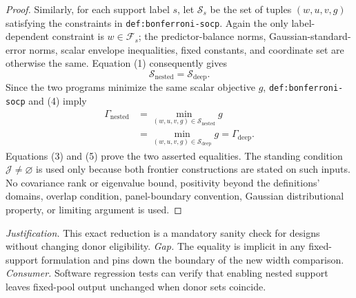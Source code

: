 \documentclass{article}
\begin{document}
\begin{proof}
Similarly, for each support label \(s\), let \(\mathcal S_s\) be the set of tuples \((w,u,v,g)\) satisfying the constraints in \texttt{def:bonferroni-socp}.  Again the only label-dependent constraint is \(w\in\mathcal F_s\); the predictor-balance norms, Gaussian-standard-error norms, scalar envelope inequalities, fixed constants, and coordinate set are otherwise the same.  Equation (1) consequently gives
\[
 \mathcal S_{\mathrm{nested}}=\mathcal S_{\mathrm{deep}}.
 \tag{4}
\]
Since the two programs minimize the same scalar objective \(g\), \texttt{def:bonferroni-socp} and (4) imply
\[
 \begin{aligned}
 \Gamma_{\mathrm{nested}}
 &=\min_{(w,u,v,g)\in\mathcal S_{\mathrm{nested}}}g\\
 &=\min_{(w,u,v,g)\in\mathcal S_{\mathrm{deep}}}g
 =\Gamma_{\mathrm{deep}}.
 \end{aligned}
 \tag{5}
\]
Equations (3) and (5) prove the two asserted equalities.  The standing condition \(\mathcal J\ne\varnothing\) is used only because both frontier constructions are stated on such inputs.  No covariance rank or eigenvalue bound, positivity beyond the definitions' domains, overlap condition, panel-boundary convention, Gaussian distributional property, or limiting argument is used.
\end{proof}
\par\smallskip\noindent \textit{Justification.} This exact reduction is a mandatory sanity check for designs without changing donor eligibility. \textit{Gap.} The equality is implicit in any fixed-support formulation and pins down the boundary of the new width comparison. \textit{Consumer.} Software regression tests can verify that enabling nested support leaves fixed-pool output unchanged when donor sets coincide.
\end{document}
